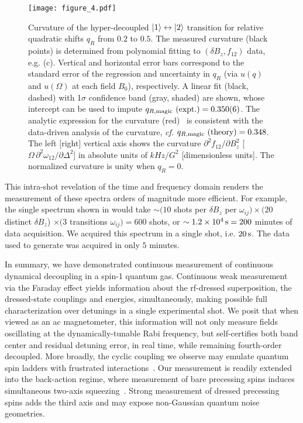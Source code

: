 \documentclass[aps,prl,reprint,superscriptaddress,floatfix]{revtex4-1}
\begin{document}
\begin{figure}
    \texttt{[image: figure\_4.pdf]}
    \caption{
    \label{fig:curvature_vs_qR}
        Curvature of the hyper-decoupled $\vert 1 \rangle  \leftrightarrow \vert 2 \rangle $ transition for relative quadratic shifts $q_R$ from $0.2$ to $0.5$.
        The measured curvature (black points) is determined from polynomial fitting to $(\delta B_z, f_{12})$ data, e.g. (c).
        Vertical and horizontal error bars correspond to the standard error of the regression and uncertainty in $q_R$ (via $u(q)$ and $u(\Omega)$ at each field $B_0$), respectively.
        A linear fit (black, dashed) with 1$\sigma$ confidence band (gray, shaded) are shown, whose intercept can be used to impute $q_{R,\text{magic}}\text{ (expt.)} = 0.350(6)$.
        The analytic expression for the curvature (red)~\cite{Note1} is consistent with the data-driven analysis of the curvature, \textit{cf.} $q_{R,\text{magic}}\text{ (theory)} = 0.348$.
        The left [right] vertical axis shows the curvature $\partial^2 f_{12}/\partial B_z^2$ [$\Omega\, \partial^2\omega_{12}/\partial \Delta^2$] in absolute units of $\unit{kHz/G^2}$ [dimensionless units].
        The normalized curvature is unity when $q_R=0$.
    }
\end{figure}

This intra-shot revelation of the time and frequency domain renders the measurement of these spectra orders of magnitude more efficient.
For example, the single spectrum shown in  would take $\sim (10$ shots per $\delta B_z$ per $\omega_{ij} ) \times (20$ distinct $\delta B_z$) $\times (3 $ transitions $\omega_{ij}) = 600$ shots, or $\sim \unit[1.2\times10^4]{s} = 200$ minutes of data acquisition.
We acquired this spectrum in a single shot, i.e. $\unit[20]{s}$.
The data used to generate  was acquired in only $5$ minutes.

In summary, we have demonstrated continuous measurement of continuous dynamical decoupling in a spin-1 quantum gas.
Continuous weak measurement via the Faraday effect yields information about the rf-dressed superposition, the dressed-state couplings and energies, simultaneously, making possible full characterization over detunings in a single experimental shot.
We posit that when viewed as an ac magnetometer, this information will not only measure fields oscillating at the dynamically-tunable Rabi frequency, but self-certifies both band center and residual detuning error, in real time, while remaining fourth-order decoupled.
More broadly, the cyclic coupling we observe may emulate quantum spin ladders with frustrated interactions~\cite{mikeska_one-dimensional_2004}.
Our measurement is readily extended into the back-action regime, where
measurement of bare precessing spins induces simultaneous two-axis squeezing~\cite{colangelo_simultaneous_2017}.
Strong measurement of dressed precessing spins adds the third axis and may expose non-Gaussian quantum noise geometries.
\end{document}

